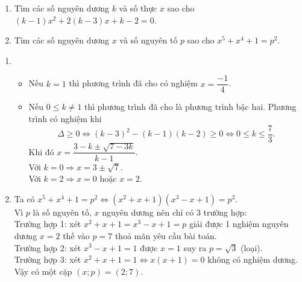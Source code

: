 \begin{bt}%
	\hfill
	\begin{enumerate}    
		\item Tìm các số nguyên dương $k$ và số thực $x$ sao cho $(k-1)x^{2}+2(k-3)x+k-2=0$.
		\item Tìm các số nguyên dương $x$ và số nguyên tố $p$ sao cho $x^{5}+x^{4}+1=p^{2}$.
	\end{enumerate}
	\loigiai
	{\begin{enumerate}    
			\item 
		\begin{itemize}
			\item Nếu $k=1$ thì phương trình đã cho có nghiệm $x=\dfrac{-1}{4}$.
			\item Nếu $0 \le k \ne 1$  thì phương trình đã cho là phương trình bậc hai. Phương trình có nghiệm khi $$\Delta \ge 0 \Leftrightarrow (k-3)^2-(k-1)(k-2) \ge 0 \Leftrightarrow 0 \le k \le \dfrac{7}{3}.$$
			Khi đó $x=\dfrac{3-k \pm \sqrt{7-3k}}{k-1}$.\\
			Với $k=0 \Rightarrow x=3 \pm \sqrt{7}$.\\
			Với $k=2 \Rightarrow x=0$  hoặc $x=2$.
	\end{itemize}
			\item Ta có $x^5+x^4+1=p^2 \Leftrightarrow (x^2+x+1) (x^3-x+1) = p^2$.\\
			Vì $p$ là số nguyên tố, $x$ nguyên dương nên chỉ có 3 trường hợp:\\
			Trường hợp 1: xét $x^2+x+1=x^3-x+1=p$ giải được 1 nghiệm nguyên dương $x=2$ thế vào $p=7$ thoả mãn yêu cầu bài toán.\\
			Trường hợp 2: xét $x^3-x+1=1$ được $x=1$ suy ra $p=\sqrt{3}$ (loại).\\
			Trường hợp 3: xét $x^2+x+1=1 \Leftrightarrow x(x+1)=0$ không có nghiệm dương.\\
			Vậy có một cặp $(x;p) =(2;7)$.
		\end{enumerate}
	}
\end{bt}

